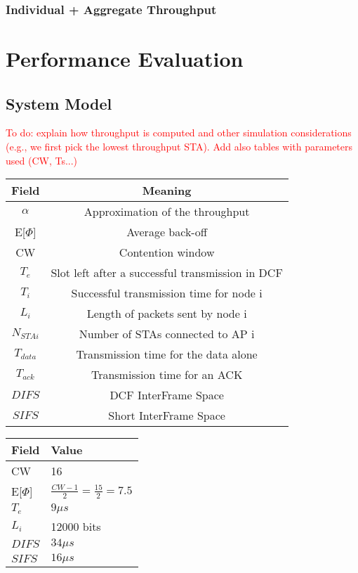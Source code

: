 \documentclass{article}
\begin{document}
		\subsubsection{Individual + Aggregate Throughput}
		\label{section:mix}

\section{Performance Evaluation}
\label{section:performance_evaluation}

	\subsection{System Model}
	\label{section:system_model}
	\textcolor{red}{To do: explain how throughput is computed and other simulation considerations (e.g., we first pick the lowest throughput STA). Add also tables with parameters used (CW, Ts...)}	
	\begin{center}
		\renewcommand*{\arraystretch}{1.25}
		\setlength\tabcolsep{15pt}
		\begin{tabular}{|c|c|}
  			\hline  
			\textbf{Field} & \textbf{Meaning}\\ \hline
			$\alpha$  & Approximation of the throughput \\\hline
			E[$\Phi$] & Average back-off\\\hline
			CW & Contention window \\\hline
			$T_e$ & Slot left after a successful transmission in DCF \\\hline
			$T_i$ & Successful transmission time for node i\\\hline
			$L_i$ & Length of packets sent by node i\\\hline
			$N_{STAi}$ & Number of STAs connected to AP i\\\hline
			$T_{data}$ & Transmission time for the data alone\\\hline
			$T_{ack}$ & Transmission time for an ACK\\\hline
			$DIFS$ & DCF InterFrame Space \\\hline
			$SIFS$ & Short InterFrame Space \\\hline
		\end{tabular}
	\end{center}

	\begin{center}
		\renewcommand*{\arraystretch}{1.25}
		\setlength\tabcolsep{15pt}
		\begin{tabular}{|P{1cm}|P{7.25cm}|}
			\hline
			\textbf{Field} & \textbf{Value}\\ \hline
			CW & 16 \\\hline
			E[$\Phi$] & $\frac{CW-1}{2}=\frac{15}{2}=7.5$ \\\hline
			$T_e$ & $9 \mu s$\\\hline
			$L_i$ & 12000 bits\\\hline
			$DIFS$ & $34 \mu s$\\\hline
			$SIFS$ & $16 \mu s$\\\hline
		\end{tabular}
	\end{center}
\end{document}
